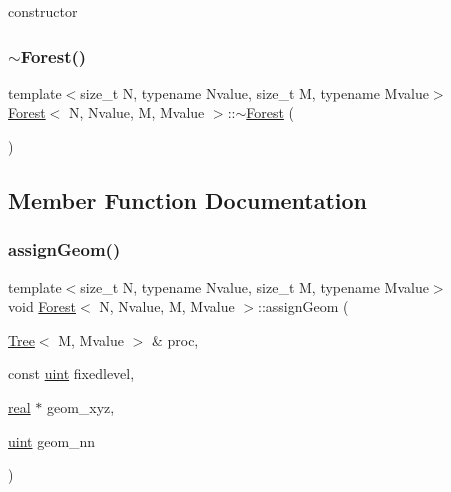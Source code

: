 constructor \mbox{\label{classForest_a08e4f9b19871f0acf49b5b2f4a321f26}} 
\subsubsection{\texorpdfstring{$\sim$\+Forest()}{~Forest()}}
{\footnotesize\ttfamily template$<$size\+\_\+t N, typename Nvalue, size\+\_\+t M, typename Mvalue$>$ \\
\mbox{\hyperlink{classForest}{Forest}}$<$ N, Nvalue, M, Mvalue $>$\+::$\sim$\mbox{\hyperlink{classForest}{Forest}} (\begin{DoxyParamCaption}{ }\end{DoxyParamCaption})\hspace{0.3cm}{\ttfamily [inline]}}



\subsection{Member Function Documentation}
\mbox{\label{classForest_a2cfcc87d38a77b1bb310334ffd1afd18}} 
\subsubsection{\texorpdfstring{assign\+Geom()}{assignGeom()}}
{\footnotesize\ttfamily template$<$size\+\_\+t N, typename Nvalue, size\+\_\+t M, typename Mvalue$>$ \\
void \mbox{\hyperlink{classForest}{Forest}}$<$ N, Nvalue, M, Mvalue $>$\+::assign\+Geom (\begin{DoxyParamCaption}\item[{\mbox{\hyperlink{classTree}{Tree}}$<$ M, Mvalue $>$ \&}]{proc,  }\item[{const \mbox{\hyperlink{definitions_8h_a69aa29b598b851b0640aa225a9e5d61d}{uint}}}]{fixedlevel,  }\item[{\mbox{\hyperlink{definitions_8h_aedc0ad84d1e764530814f57ad931d02a}{real}} $\ast$}]{geom\+\_\+xyz,  }\item[{\mbox{\hyperlink{definitions_8h_a69aa29b598b851b0640aa225a9e5d61d}{uint}}}]{geom\+\_\+nn }\end{DoxyParamCaption})}

